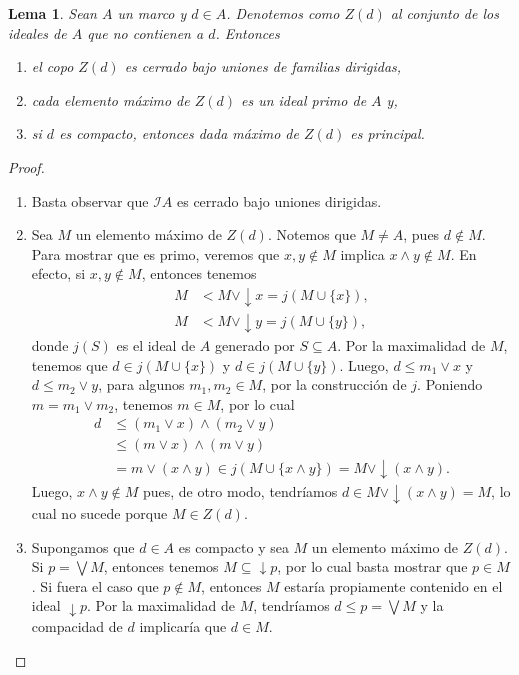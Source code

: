 \documentclass[12pt,letterpaper,titlepage]{article}
\newtheorem{lemma}{Lema}
\theoremstyle{definition}
\renewcommand\sup{\vee}
\newcommand\Sup{\bigvee}
\newcommand\down{{\downarrow}}
\renewcommand\inf{\wedge}
\renewcommand\cal[1]{\mathcal{#1}}
\newcommand\<{\langle}
\renewcommand\>{\rangle}
\begin{document}
\begin{lemma}
    Sean $A$ un marco y $d\in A$.
    Denotemos como $Z(d)$ al conjunto de los ideales de $A$
    que no contienen a $d$.
    Entonces
    \begin{enumerate}
        \item el copo $Z(d)$ es cerrado bajo uniones de familias
        dirigidas,
        \item cada elemento máximo de $Z(d)$ es un ideal primo de $A$ y,
        \item si $d$ es compacto, entonces dada máximo de $Z(d)$
        es principal.
    \end{enumerate}
\end{lemma}
\begin{proof}
    \begin{enumerate}
        \item Basta observar que $\cal IA$ es cerrado
        bajo uniones dirigidas.
        \item Sea $M$ un elemento máximo de $Z(d)$.
        Notemos que $M\neq A$, pues $d\nin M$.
        Para mostrar que es primo, veremos que $x,y\nin M$ implica
        $x\inf y\nin M$.
        En efecto, si $x,y\nin M$,
        entonces tenemos
        \begin{align*}
            M&<M\sup \down x=j(M\cup\{x\}), \\
            M&<M\sup\down y = j(M\cup\{y\}),
        \end{align*}
        donde $j(S)$ es el ideal de $A$ generado por $S\subseteq A$.
        Por la maximalidad de $M$, tenemos que $d\in j(M\cup\{x\})$
        y $d\in j(M\cup\{y\})$.
        Luego, $d\leq m_1\sup x$ y $d\leq m_2\sup y$, para algunos
        $m_1,m_2\in M$, por la construcción de $j$.
        Poniendo $m=m_1\sup m_2$, tenemos $m\in M$, por lo cual
        \begin{align*}
            d   &\leq (m_1\sup x)\inf(m_2\sup y) \\
                &\leq (m\sup x)\inf(m\sup y) \\
                &=m\sup (x\inf y)
                \in j(M\cup\{x\inf y\})
                = M\sup\down(x\inf y).
        \end{align*}
        Luego, $x\inf y\nin M$ pues,
        de otro modo, tendríamos $d\in M\sup\down(x\inf y)=M$,
        lo cual no sucede porque $M\in Z(d)$.
        
        \item 
        Supongamos que $d\in A$ es compacto y sea $M$ un elemento
        máximo de $Z(d)$.
        Si $p=\Sup M$, entonces tenemos $M\subseteq\down p$,
        por lo cual basta mostrar que $p\in M$.
        Si fuera el caso que $p\nin M$,
        entonces $M$ estaría propiamente contenido
        en el ideal $\down p$.
        Por la maximalidad de $M$, tendríamos $d\leq p=\Sup M$
        y la compacidad de $d$ implicaría que $d\in M$.
    \end{enumerate}
\end{proof}
\end{document}

